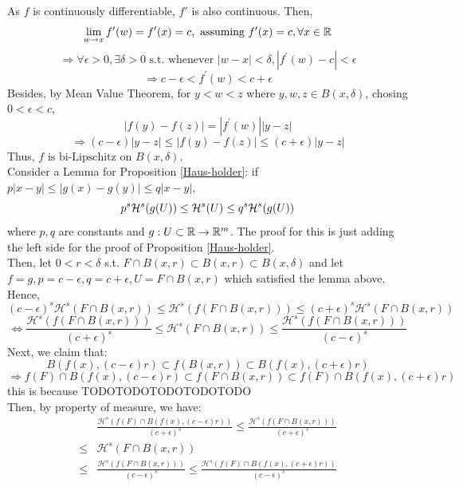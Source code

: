 \begin{customsol}{5.2}
    As $f$ is continuously differentiable, $f'$ is also continuous. Then, $$\displaystyle \lim_{w\rightarrow x}f^\prime (w) = f^\prime(x) = c, \text{ assuming }f^\prime(x) = c, \forall x\in \mathbb{R}$$
    $$
    \Rightarrow \forall \epsilon >0, \exists \delta>0\text{ s.t. whenever }|w-x|<\delta, |f^\prime(w) - c| < \epsilon $$
    $$\Rightarrow c-\epsilon < f^\prime(w) < c+\epsilon
    $$
    Besides, by Mean Value Theorem, for $y<w<z$ where $y, w, z \in B(x, \delta)$, chosing $0<\epsilon<c$,
    $$|f(y)-f(z)| = |f^\prime(w)||y - z|$$
    $$\Rightarrow (c-\epsilon) |y-z| \leq |f(y)-f(z)|\leq (c+\epsilon)|y-z|$$
    Thus, $f\text{ is bi-Lipschitz on }B(x, \delta)$.\\
    Consider a Lemma for Proposition \ref{Haus-holder}: 
    if $p|x-y|\leq |g(x)-g(y)|\leq q|x-y|$, $$p^s\mathcal{H}^s(g(U))\leq \mathcal{H}^s(U) \leq q^s\mathcal{H}^s(g(U))$$
    where $p,q$ are constants and $g: U\subset \mathbb{R} \rightarrow \mathbb{R}^m$. The proof for this is just adding the left side for the proof of Proposition \ref{Haus-holder}.\\
    Then, let $0<r<\delta$ s.t. $F\cap B(x, r)\subset B(x, r)\subset B(x,\delta)$ and let $f=g, p=c-\epsilon, q=c+\epsilon, U = F\cap B(x, r)$ which satisfied the lemma above. Hence,
    $$
    (c-\epsilon)^{s} \mathcal{H}^{s}(F \cap B(x, r)) \leq \mathcal{H}^{s}(f(F \cap B(x, r))) \leq(c+\epsilon)^{s} \mathcal{H}^{s}(F \cap B(x, r))
    $$
    $$
    \Leftrightarrow \frac{\mathcal{H}^{s}(f(F \cap B(x, r)))}{(c+\epsilon)^{s}}  \leq \mathcal{H}^{s}(F \cap B(x, r)) \leq \frac{\mathcal{H}^{s}(f(F \cap B(x, r)))}{(c-\epsilon)^{s}} 
    $$
    Next, we claim that: 
    $$B(f(x),(c-\epsilon) r) \subset f(B(x, r)) \subset B(f(x),(c+\epsilon) r)$$
    $$\Rightarrow f(F)\cap B(f(x), (c-\epsilon)r) \subset f(F\cap B(x, r)) \subset f(F)\cap B(f(x), (c+\epsilon)r)$$
    this is because TODOTODOTODOTODOTODO\\
    Then, by property of measure, we have:
    $$
    \begin{aligned}
        &\frac{\mathcal{H}^{s}(f(F) \cap B(f(x),(c-\epsilon) r))}{(c+\epsilon)^{s}}\leq \frac{\mathcal{H}^{s}(f(F \cap B(x, r)))}{(c+\epsilon)^{s}} \\
        \leq & \mathcal{H}^{s}(F \cap B(x, r)) \\
        \leq & \frac{\mathcal{H}^{s}(f(F \cap B(x, r)))}{(c-\epsilon)^{s}} \leq \frac{\mathcal{H}^{s}(f(F) \cap B(f(x),(c+\epsilon) r))}{(c-\epsilon)^{s}}
    \end{aligned}
    $$
    $$
$$
\end{customsol}
